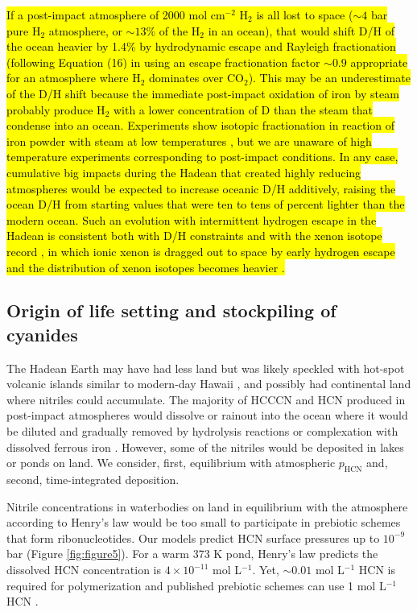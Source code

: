 \hl{If a post-impact atmosphere of 2000 mol cm$^{-2}$ H$_2$ is all lost to space ($\sim 4$ bar pure H$_2$ atmosphere, or $\sim 13\%$ of the H$_2$ in an ocean), that would shift D/H of the ocean heavier by 1.4\% by hydrodynamic escape and Rayleigh fractionation (following Equation (16) in \mbox{\citet{Zahnle_2019}} using an escape fractionation factor $\sim 0.9$ appropriate for an atmosphere where H$_2$ dominates over CO$_2$). This may be an underestimate of the D/H shift because the immediate post-impact oxidation of iron by steam probably produce H$_2$ with a lower concentration of D than the steam that condense into an ocean. Experiments show isotopic fractionation in reaction of iron powder with steam at low temperatures \mbox{\citep{Smith_1957}}, but we are unaware of high temperature experiments corresponding to post-impact conditions. In any case, cumulative big impacts during the Hadean that created highly reducing atmospheres would be expected to increase oceanic D/H additively, raising the ocean D/H from starting values that were ten \mbox{\citep{Piani_2020}} to tens of percent \mbox{\citep{Alexander_2012}} lighter than the modern ocean. Such an evolution with intermittent hydrogen escape in the Hadean is consistent both with D/H constraints and with the xenon isotope record \mbox{\citep{Avice_2018}}, in which ionic xenon is dragged out to space by early hydrogen escape and the distribution of xenon isotopes becomes heavier \mbox{\citep{Zahnle_2019}}.}

\subsection{Origin of life setting and stockpiling of cyanides}

The Hadean Earth may have had less land but was likely speckled with hot-spot volcanic islands similar to modern-day Hawaii \citep{Bada_2018}, and possibly had continental land \citep{Korenaga_2021} where nitriles could accumulate. The majority of HCCCN and HCN produced in post-impact atmospheres would dissolve or rainout into the ocean where it would be diluted and gradually removed by hydrolysis reactions \citep{Miyakawa_2002} or complexation with dissolved ferrous iron \citep{Keefe_1996}. However, some of the nitriles would be deposited in lakes or ponds on land. We consider, first, equilibrium with atmospheric $p_\mathrm{HCN}$ and, second, time-integrated deposition.

Nitrile concentrations in waterbodies on land in equilibrium with the atmosphere according to Henry's law would be too small to participate in prebiotic schemes that form ribonucleotides. Our models predict HCN surface pressures up to $10^{-9}$ bar (Figure \ref{fig:figure5}). For a warm 373 K pond, Henry's law predicts the dissolved HCN concentration is $4 \times 10^{-11}$ mol L$^{-1}$. Yet, $\sim 0.01$ mol L$^{-1}$ HCN is required for polymerization \citep{Sanchez_1967} and published prebiotic schemes can use 1 mol L$^{-1}$ HCN \citep{Patel_2015}.

